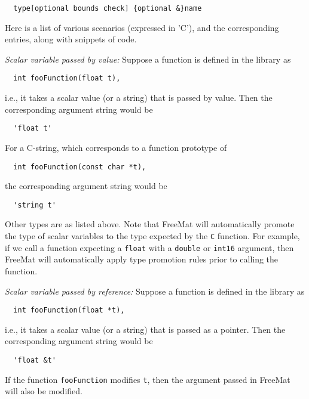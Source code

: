 \begin{verbatim}
  type[optional bounds check] {optional &}name
\end{verbatim}

Here is a list of various scenarios (expressed in 'C'), and the corresponding
entries, along with snippets of code.

\emph{Scalar variable passed by value:}
Suppose a function is defined in the library as
\begin{verbatim}
  int fooFunction(float t),
\end{verbatim}
i.e., it takes a scalar value (or a string) that is passed by value.  Then
the corresponding argument string would be
\begin{verbatim}
  'float t'
\end{verbatim}
For a C-string, which corresponds to a function prototype of
\begin{verbatim}
  int fooFunction(const char *t),
\end{verbatim}
the corresponding argument string would be
\begin{verbatim}
  'string t'
\end{verbatim}
Other types are as listed above.  Note that FreeMat will automatically
promote the type of scalar variables to the type expected by the \verb|C|
function.  For example, if we call a function expecting a \verb|float|
with a \verb|double| or \verb|int16| argument, then FreeMat will automatically
apply type promotion rules prior to calling the function.

\emph{Scalar variable passed by reference:}
Suppose a function is defined in the library as
\begin{verbatim}
  int fooFunction(float *t),
\end{verbatim}
i.e., it takes a scalar value (or a string) that is passed as a pointer.  Then
the corresponding argument string would be
\begin{verbatim}
  'float &t'
\end{verbatim}
If the function \verb|fooFunction| modifies \verb|t|, then the argument
passed in FreeMat will also be modified.

